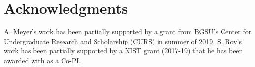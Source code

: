 \documentclass{mcurcsm}
\begin{document}
%

\balance

\section{Acknowledgments} A. Meyer's work has been partially supported by a grant from BGSU's Center for Undergraduate Research and Scholarship 
(CURS) in summer of 2019. S. Roy's work has been partially supported by a NIST grant (2017-19) that he has been awarded with as a Co-PI. 

%

%


\end{document}

